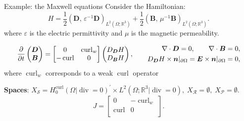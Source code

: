 \documentclass[aspectratio=169]{beamer}
\renewcommand{\div}{\operatorname{div}}
\DeclareMathOperator*{\curl}{curl}
\newcommand{\bbR}{\mathbb{R}}
\newcommand{\inpr}[3][]{\ensuremath{( #2, \, #3 )_{#1}}}
\begin{document}
\begin{frame}{Example: the Maxwell equations}
	Consider the Hamiltonian:
	\begin{equation*}
		{H} = \frac{1}{2} \inpr[L^2(\Omega; \bbR^3)]{\bm{D}}{\varepsilon^{-1}\bm{D}} + \frac{1}{2} \inpr[L^2(\Omega; \bbR^3)]{\bm{B}}{\mu^{-1}\bm{B}}.
	\end{equation*}
where  $\varepsilon$ is the electric permittivity and $\mu$ is the magnetic permeability.\\
\vspace{.3cm}
\begin{tcolorbox}[nobeforeafter, colframe=theme,title=The Maxwell equation on $\Omega \subset \bbR^3$ with conducting boundary condition]%
	\begin{equation*}
		\diffp{}{t}\begin{pmatrix}
			\bm{D} \\ \bm{B} 
		\end{pmatrix} = 
		\begin{bmatrix}
			0 & \curl_w \\
			-\curl & 0 \\
		\end{bmatrix}
		\begin{pmatrix}
			D_{\bm{D}}{H} \\
			D_{\bm{B}}{H} \\
		\end{pmatrix},\qquad 
	\begin{aligned}
		\nabla \cdot \bm{D}= 0, \qquad	\nabla \cdot \bm{B}= 0, \\
			D_{\bm{D}}{H} \times \bm{n}|_{\partial\Omega}= \bm{E} \times \bm{n}|_{\partial\Omega}=0,
	\end{aligned}
	\end{equation*}
	where $\curl_w$ corresponds to a weak $\curl$ operator

	\textbf{Spaces}: $X_{\mathcal{S}}=H^{\curl}_0(\Omega| \div=0)^{'} \times L^2(\Omega; \bbR^3|\div=0), \; X_{\mathcal{R}} = \emptyset, \; X_{\mathcal{P}}= \emptyset$. 
	\begin{equation*}
		J = \begin{bmatrix}
			0 & -\curl_w \\
			\curl & 0 \\
		\end{bmatrix}.
	\end{equation*}
\end{tcolorbox} 

	
	
\end{frame}
\end{document}
